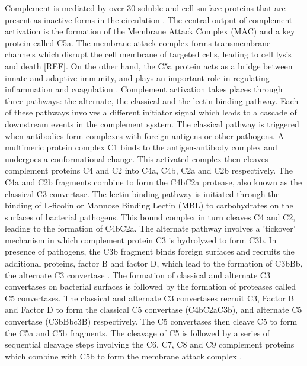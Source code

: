 \documentclass[12pt]{article}
\begin{document}
Complement is mediated by over 30 soluble and cell surface proteins that are present as inactive forms in the circulation \cite{walport2001complement}.
The central output of complement activation is the formation of the Membrane Attack Complex (MAC) and a key protein called C5a.
The membrane attack complex forms transmembrane channels which disrupt the cell membrane of targeted cells, leading to cell lysis and death [REF].
On the other hand, the C5a protein acts as a bridge between innate and adaptive immunity, and plays an important role in regulating inflammation and coagulation \cite{sarma2011complement}.
Complement activation takes places through three pathways: the alternate, the classical and the lectin binding pathway.
Each of these pathways involves a different initiator signal which leads to a cascade of downstream events in the complement system.
The classical pathway is triggered when antibodies form complexes with foreign antigens or other pathogens.
A multimeric protein complex C1 binds to the antigen-antibody complex and undergoes a conformational change.
This activated complex then cleaves complement proteins C4 and C2 into C4a, C4b, C2a and C2b respectively.
The C4a and C2b fragments combine to form the C4bC2a protease, also known as the classical C3 convertase.
The lectin binding pathway is initiated through the binding of L-ficolin or Mannose Binding Lectin (MBL) to carbohydrates on the surfaces of bacterial pathogens.
This bound complex in turn cleaves C4 and C2, leading to the formation of C4bC2a.
The alternate pathway involves a 'tickover' mechanism in which complement protein C3 is hydrolyzed to form C3b.
In presence of pathogens, the C3b fragment binds foreign surfaces and recruits the additional proteins, factor B and factor D, which lead to the formation of C3bBb, the alternate C3 convertase \cite{pangburn1984alternative}.
The formation of classical and alternate C3 convertases on bacterial surfaces is followed by the formation of proteases called C5 convertases.
The classical and alternate C3 convertases recruit C3, Factor B and Factor D to form the classical C5 convertase (C4bC2aC3b), and alternate C5 convertase (C3bBbc3B) respectively.
The C5 convertases then cleave C5 to form the C5a and C5b fragments.
The cleavage of C5 is followed by a series of sequential cleavage steps involving the C6, C7, C8 and C9 complement proteins
which combine with C5b to form the membrane attack complex \cite{ricklin2010complement}.
\end{document}
